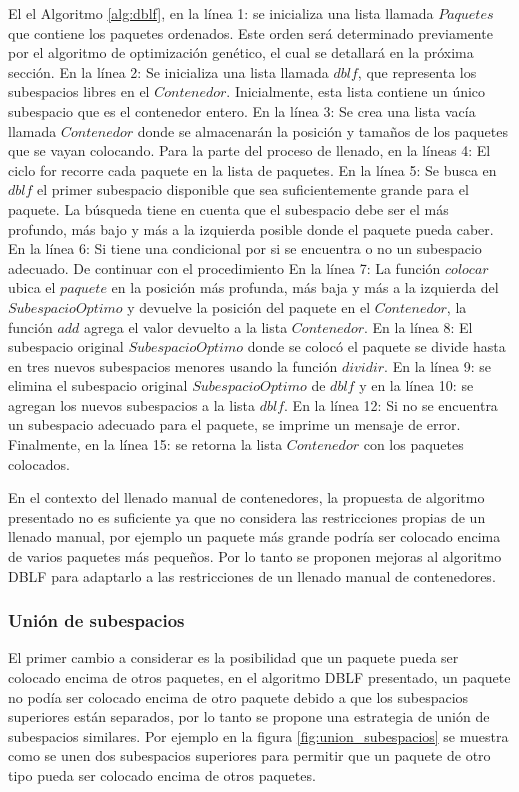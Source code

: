 El el Algoritmo \ref{alg:dblf}, en la línea 1: se inicializa una lista llamada $Paquetes$ que contiene los paquetes ordenados. Este orden será determinado previamente por el algoritmo de optimización genético, el cual se detallará en la próxima sección. En la línea 2: Se inicializa una lista llamada $dblf$, que representa los subespacios libres en el $Contenedor$. Inicialmente, esta lista contiene un único subespacio que es el contenedor entero. En la línea 3: Se crea una lista vacía llamada $Contenedor$ donde se almacenarán la posición y tamaños de los paquetes que se vayan colocando. Para la parte del proceso de llenado, en la líneas 4: El ciclo for recorre cada paquete en la lista de paquetes.
En la línea 5: Se busca en $dblf$ el primer subespacio disponible que sea suficientemente grande para el paquete. La búsqueda tiene en cuenta que el subespacio debe ser el más profundo, más bajo y más a la izquierda posible donde el paquete pueda caber. En la línea 6: Si tiene una condicional por si se encuentra o no un subespacio adecuado. De continuar con el procedimiento En la línea 7: La función $colocar$ ubica el $paquete$ en la posición más profunda, más baja y más a la izquierda del $SubespacioOptimo$ y devuelve la posición del paquete en el $Contenedor$, la función $add$ agrega el valor devuelto a la lista $Contenedor$. En la línea 8: El subespacio original $SubespacioOptimo$ donde se colocó el paquete se divide hasta en tres nuevos subespacios menores usando la función $dividir$. En la línea 9: se elimina el subespacio original $SubespacioOptimo$ de $dblf$ y en la línea 10: se agregan los nuevos subespacios a la lista $dblf$. En la línea 12: Si no se encuentra un subespacio adecuado para el paquete, se imprime un mensaje de error. Finalmente, en la línea 15: se retorna la lista $Contenedor$ con los paquetes colocados.

En el contexto del llenado manual de contenedores, la propuesta de algoritmo presentado no es suficiente ya que no considera las restricciones propias de un llenado manual, por ejemplo un paquete más grande podría ser colocado encima de varios paquetes más pequeños. Por lo tanto se proponen mejoras al algoritmo DBLF para adaptarlo a las restricciones de un llenado manual de contenedores.

\subsubsection{Unión de subespacios}

El primer cambio a considerar es la posibilidad que un paquete pueda ser colocado encima de otros paquetes, en el algoritmo DBLF presentado, un paquete no podía ser colocado encima de otro paquete debido a que los subespacios superiores están separados, por lo tanto se propone una estrategia de unión de subespacios similares. Por ejemplo en la figura \ref{fig:union_subespacios} se muestra como se unen dos subespacios superiores para permitir que un paquete de otro tipo pueda ser colocado encima de otros paquetes.

